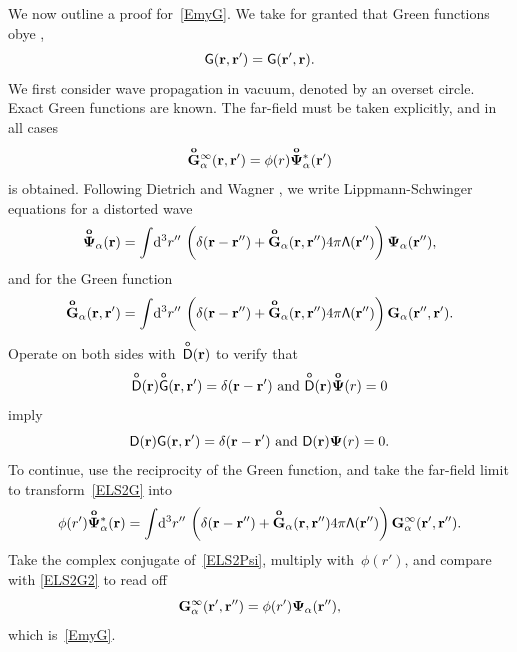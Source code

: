 We now outline a proof for~\cref{EmyG}.
We take for granted that Green functions obye  \cite{Pot04},
\begin{equation}
  \mathsf{G}(\mathbf{r},\mathbf{r}') = \mathsf{G}(\mathbf{r}',\mathbf{r}).
\end{equation}
We first consider wave propagation in vacuum,
denoted by an overset circle.
Exact Green functions
are known.
The far-field must be taken explicitly,
and in all cases
\begin{equation}
  \vGo_\alpha^\infty(\r,\r') = \phi(r)\Psio_\alpha^*(\r')
\end{equation}
is obtained.
Following Dietrich and Wagner \cite{DiWa84,DiWa85,DiWa16},
we write Lippmann-Schwinger equations for a distorted wave
\begin{equation}\label{ELS2Psi}
   \Psio_\alpha(\r)
   = \int\!\d^3r''\, \left( \delta(\r-\r'') + \vGo_\alpha(\r,\r'')4\pi\TL(\r'') \right)
                     \v\Psi_\alpha(\r''),
\end{equation}
and for the Green function
\begin{equation}\label{ELS2G}
   \vGo_\alpha(\r,\r')
   = \int\!\d^3r''\, \left( \delta(\r-\r'') + \vGo_\alpha(\r,\r'')4\pi\TL(\r'') \right)
                     \v{G}_\alpha(\r'',\r').
\end{equation}
Operate on both sides with~$\mathsf{\overset{o}{D}}(\mathbf{r})$ to verify that
\begin{equation}
  \TDo(\r)\TGo(\r,\r') = \Td(\r-\r') \text{ and } \TDo(\r)\Psio(r)=0
\end{equation}
imply
\begin{equation}
  \mathsf{D}(\mathbf{r})\mathsf{G}(\mathbf{r},\mathbf{r}') = \mathsf{\delta}(\mathbf{r}-\mathbf{r}') \text{ and } \mathsf{D}(\mathbf{r})\mathbf{\Psi}(r)=0.
\end{equation}
To continue, use the reciprocity of the Green function,
and take the far-field limit to transform~\cref{ELS2G} into
\begin{equation}\label{ELS2G2}
   \phi(r')\Psio_\alpha^*(\r)
   = \int\!\d^3r''\, \left( \delta(\r-\r'') + \vGo_\alpha(\r,\r'')4\pi\TL(\r'') \right)
                     \v{G}_\alpha^\infty(\r',\r'').
\end{equation}
Take the complex conjugate of~\cref{ELS2Psi},
multiply with~$\phi(r')$, and compare with \cref{ELS2G2}
to read off
\begin{equation}
   \mathbf{G}_\alpha^\infty(\mathbf{r}',\mathbf{r}'') = \phi(r')\mathbf{\Psi}_\alpha(\mathbf{r}''),
\end{equation}
which is~\cref{EmyG}.

\iffalse
